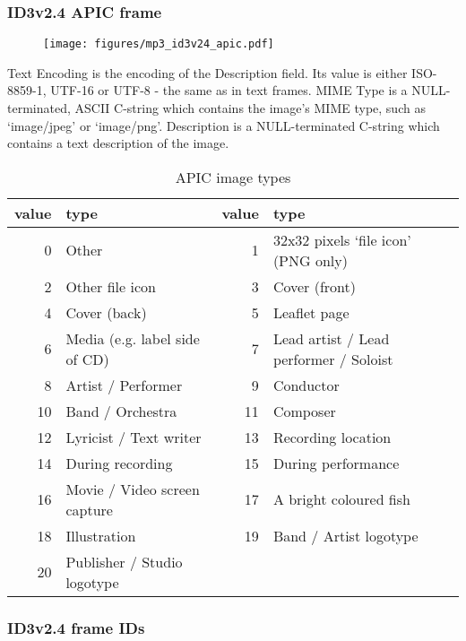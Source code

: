 \pagebreak

\subsubsection{ID3v2.4 APIC frame}
\begin{figure}[h]
\texttt{[image: figures/mp3\_id3v24\_apic.pdf]}
\end{figure}
\par
\noindent
Text Encoding is the encoding of the Description field.
Its value is either ISO-8859-1, UTF-16 or UTF-8 - the same as in
text frames.
MIME Type is a NULL-terminated, ASCII C-string which contains the
image's MIME type, such as `image/jpeg' or `image/png'.
Description is a NULL-terminated C-string which contains
a text description of the image.
\begin{table}[h]
{
\begin{tabular}{|r|l||r|l|}
\hline
value & type & value & type \\
\hline
0 & Other & 1 & 32x32 pixels `file icon' (PNG only) \\
2 & Other file icon & 3 & Cover (front) \\
4 & Cover (back) & 5 & Leaflet page \\
6 & Media (e.g. label side of CD) & 7 & Lead artist / Lead performer / Soloist \\
8 & Artist / Performer & 9 & Conductor \\
10 & Band / Orchestra & 11 & Composer \\
12 & Lyricist / Text writer & 13 & Recording location \\
14 & During recording & 15 & During performance \\
16 & Movie / Video screen capture & 17 & A bright coloured fish \\
18 & Illustration & 19 & Band / Artist logotype \\
20 & Publisher / Studio logotype & &  \\
\hline
\end{tabular}
\caption{APIC image types}
}
\end{table}

\pagebreak

\subsubsection{ID3v2.4 frame IDs}

